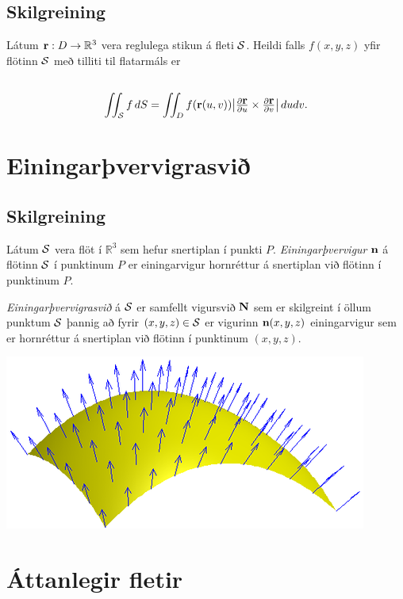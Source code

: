 \documentclass[a4paper,10pt,icelandic]{sphinxmanual}
\begin{document}
\subsection{Skilgreining}
\label{Kafli5:id22}
Látum \(\mbox{${\bf r}$}: D\rightarrow {\mathbb  R}^3\) vera
reglulega stikun á fleti \(\cal S\). Heildi falls \(f(x,y,z)\)
yfir flötinn \(\cal S\) með tilliti til flatarmáls er
\begin{gather}
\begin{split}\displaystyle\end{split}\notag\\\begin{split}\int\!\!\!\int_{\cal S} f\,dS=\int\!\!\!\int_D f(\mbox{${\bf r}$}(u,v)) \big|{\textstyle\frac{\partial
    \mbox{${\bf r}$}}{\partial u}
\times\frac{\partial \mbox{${\bf r}$}}{\partial v}}\big|\,dudv.\end{split}\notag
\end{gather}

\section{Einingarþvervigrasvið}
\label{Kafli5:einingarvervigrasvi}

\subsection{Skilgreining}
\label{Kafli5:id23}
Látum \(\cal S\) vera flöt í \({\mathbb  R}^3\) sem hefur snertiplan í punkti \(P\).
\emph{Einingarþvervigur} \(\mbox{${\bf n}$}\) á flötinn \(\cal S\) í
punktinum \(P\) er einingarvigur hornréttur á snertiplan við flötinn
í punktinum \(P\).

\emph{Einingarþvervigrasvið} á \(\cal S\) er samfellt vigursvið
\(\mbox{${\bf N}$}\) sem er skilgreint í öllum punktum
\(\cal S\) þannig að fyrir \((x,y,z)\in{\cal S}\) er vigurinn
\(\mbox{${\bf n}$}(x,y,z)\) einingarvigur sem er hornréttur á
snertiplan við flötinn í punktinum \((x,y,z)\).

{\hfill\includegraphics[width=0.500\linewidth]{normalfield.png}\hfill}


\section{Áttanlegir fletir}
\label{Kafli5:attanlegir-fletir}
\end{document}
